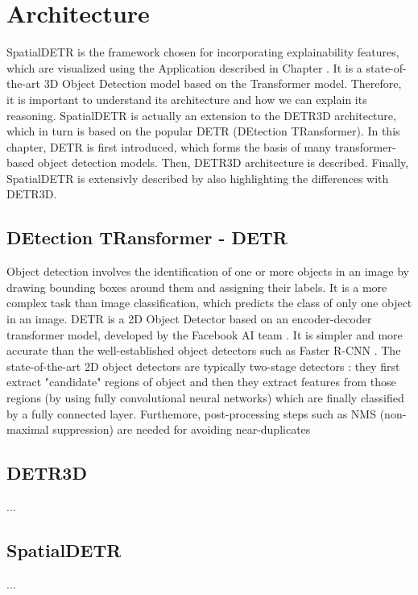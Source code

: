 \chapter{Architecture}
SpatialDETR is the framework chosen for incorporating explainability features, which are visualized using the Application described in Chapter \cite{ch:app}. It is a state-of-the-art 3D Object Detection model based on the Transformer model. Therefore, it is important to understand its architecture and how we can explain its reasoning.
SpatialDETR is actually an extension to the DETR3D architecture, which in turn is based on the popular DETR (DEtection TRansformer). 
In this chapter, DETR is first introduced, which forms the basis of many transformer-based object detection models. Then, DETR3D architecture is described. Finally, SpatialDETR is extensivly described by also highlighting the differences with DETR3D.
\label{ch:sota}
\section{DEtection TRansformer - DETR}
Object detection involves the identification of one or more objects in an image by drawing bounding boxes around them and assigning their labels. It is a more complex task than image classification, which predicts the class of only one object in an image.
DETR is a 2D Object Detector based on an encoder-decoder transformer model, developed by the Facebook AI team \cite{carion2020end}. It is simpler and more accurate than the well-established object detectors such as Faster R-CNN \cite{ren2015faster}. 
The state-of-the-art 2D object detectors are typically two-stage detectors \cite{girshick2015fast} \cite{carion2020end}: they first extract "candidate" regions of object and then they extract features from those regions (by using fully convolutional neural networks) which are finally classified by a fully connected layer. Furthemore, post-processing steps such as NMS (non-maximal suppression) are needed for avoiding near-duplicates

\section{DETR3D}
...

\section{SpatialDETR}
...
